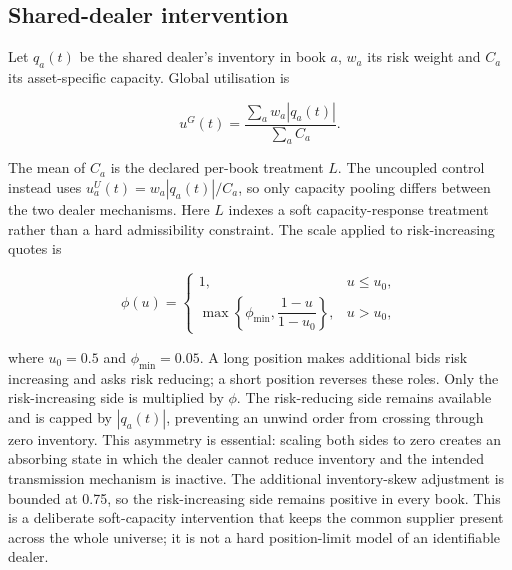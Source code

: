 \subsection{Shared-dealer intervention}

Let $q_a(t)$ be the shared dealer's inventory in book $a$, $w_a$ its risk
weight and $C_a$ its asset-specific capacity.  Global utilisation is

\begin{equation}
  u^G(t)=\frac{\sum_a w_a|q_a(t)|}{\sum_a C_a}.
\end{equation}

The mean of $C_a$ is the declared per-book treatment $L$.  The uncoupled
control instead uses $u_a^U(t)=w_a|q_a(t)|/C_a$, so only capacity pooling
differs between the two dealer mechanisms.  Here $L$ indexes a soft
capacity-response treatment rather
than a hard admissibility constraint.  The scale applied to risk-increasing
quotes is

\begin{equation}
  \phi(u)=
  \begin{cases}
    1, & u\leq u_0,\\
    \max\!\left\{\phi_{\min},\dfrac{1-u}{1-u_0}\right\}, & u>u_0,
  \end{cases}
\end{equation}

where $u_0=0.5$ and $\phi_{\min}=0.05$.  A long position makes additional bids risk increasing and
asks risk reducing; a short position reverses these roles.  Only the
risk-increasing side is multiplied by $\phi$.  The risk-reducing side
remains available and is capped by $|q_a(t)|$, preventing an unwind order from
crossing through zero inventory.  This asymmetry is essential: scaling both
sides to zero creates an absorbing state in which the dealer cannot reduce
inventory and the intended transmission mechanism is inactive.  The
additional inventory-skew adjustment is bounded at 0.75, so the
risk-increasing side remains positive in every book.  This is a deliberate
soft-capacity intervention that keeps the common supplier present across the
whole universe; it is not a hard position-limit model of an identifiable
dealer.

